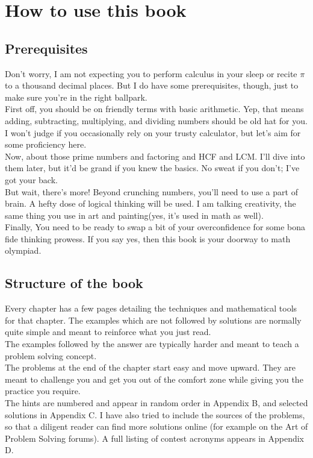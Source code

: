\chapter*{How to use this book}
\section{Prerequisites}
Don't worry, I am not expecting you to perform calculus in your sleep or recite $\pi$ to a thousand decimal places. But I do have some prerequisites, though, just to make sure you're in the right ballpark.\\
First off, you should be on friendly terms with basic arithmetic. Yep, that means adding, subtracting, multiplying, and dividing numbers should be old hat for you. I won't judge if you occasionally rely on your trusty calculator, but let's aim for some proficiency here.\\
Now, about those prime numbers and factoring and HCF and LCM. I'll dive into them later, but it'd be grand if you knew the basics. No sweat if you don't; I've got your back.\\
But wait, there's more! Beyond crunching numbers, you'll need to use a part of brain. A hefty dose of logical thinking will be used. I am talking creativity, the same thing you use in art and painting(yes, it's used in math as well).\\
Finally, You need to be ready to swap a bit of your overconfidence for some bona fide thinking prowess. If you say yes, then this book is your doorway to math olympiad.\\
\section{Structure of the book}
Every chapter has a few pages detailing the techniques and mathematical tools for that chapter. The examples which are not followed by solutions are normally quite simple and meant to reinforce what you just read.\\
The examples followed by the answer are typically harder and meant to teach a problem solving concept.\\
The problems at the end of the chapter start easy and move upward. They are meant to challenge you and get you out of the comfort zone while giving you the practice you require. \\
The hints are numbered and appear in random order in Appendix B, and selected solutions in Appendix C. I have also tried to include the sources of the problems, so that a diligent reader can find more solutions online (for example on the Art of Problem Solving forums). A full listing of contest acronyms appears in Appendix D.\\
